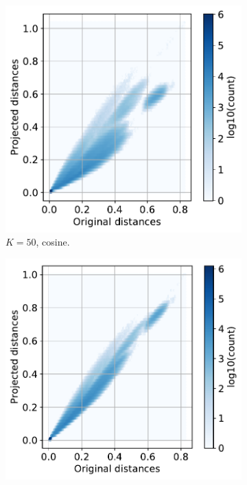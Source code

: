 \documentclass[11pt,onecolumn]{article}
\begin{document}
\begin{figure}[h!]
    \centering
    \begin{subfigure}[t]{0.29\textwidth}
        \centering
        \includegraphics[width=\linewidth]{fig/sparse_projection_cosine_k50.pdf}
        \caption{$K=50$, cosine.}
    \end{subfigure}
    \hfill
		\begin{subfigure}[t]{0.29\textwidth}
				\centering
				\includegraphics[width=\linewidth]{fig/sparse_projection_cosine_k100.pdf}

\end{subfigure}
\end{figure}
\end{document}
